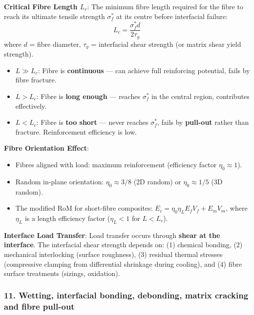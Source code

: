 \documentclass{NoteThesis/note-thesis}
\begin{document}
    \textbf{Critical Fibre Length $L_c$}:
    The minimum fibre length required for the fibre to reach its ultimate tensile strength $\sigma_f^*$ at its centre before interfacial failure:
    \begin{equation*}
        L_c = \frac{\sigma_f^* d}{2 \tau_y}
    \end{equation*}
    where $d$ = fibre diameter, $\tau_y$ = interfacial shear strength (or matrix shear yield strength).

    \begin{itemize}
        \item $L \gg L_c$: Fibre is \textbf{continuous} — can achieve full reinforcing potential, fails by fibre fracture.
        \item $L > L_c$: Fibre is \textbf{long enough} — reaches $\sigma_f^*$ in the central region, contributes effectively.
        \item $L < L_c$: Fibre is \textbf{too short} — never reaches $\sigma_f^*$, fails by \textbf{pull-out} rather than fracture. Reinforcement efficiency is low.
    \end{itemize}

    \textbf{Fibre Orientation Effect}:
    \begin{itemize}
        \item Fibres aligned with load: maximum reinforcement (efficiency factor $\eta_0 \approx 1$).
        \item Random in-plane orientation: $\eta_0 \approx 3/8$ (2D random) or $\eta_0 \approx 1/5$ (3D random).
        \item The modified RoM for short-fibre composites: $E_c = \eta_0 \eta_L E_f V_f + E_m V_m$, where $\eta_L$ is a length efficiency factor ($\eta_L < 1$ for $L < L_c$).
    \end{itemize}

    \textbf{Interface Load Transfer}:
    Load transfer occurs through \textbf{shear at the interface}. The interfacial shear strength depends on: (1) chemical bonding, (2) mechanical interlocking (surface roughness), (3) residual thermal stresses (compressive clamping from differential shrinkage during cooling), and (4) fibre surface treatments (sizings, oxidation).

\subsubsection*{11. Wetting, interfacial bonding, debonding, matrix cracking and fibre pull-out}
\end{document}

